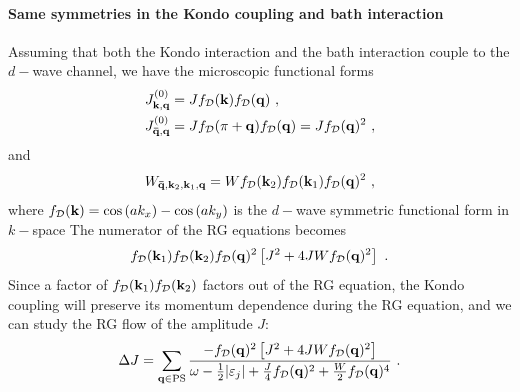 \documentclass[reprint,hidelinks]{revtex4-2}
\begin{document}
\paragraph{Same symmetries in the Kondo coupling and bath interaction}
Assuming that both the Kondo interaction and the bath interaction couple to the \(d-\)wave channel, we have the microscopic functional forms 
\begin{equation}\begin{aligned}
	J^{(0)}_{{\bf k},{\bf q}} &= J f_\mathcal{D}({\bf k}) f_\mathcal{D}({\bf q})~,\\
	J^{(0)}_{{\bf \bar q},{\bf q}} &= J f_\mathcal{D}(\pi + {\bf q}) f_\mathcal{D}({\bf q}) = Jf_\mathcal{D}({\bf q})^2 ~,
\end{aligned}\end{equation}
and
\begin{equation}\begin{aligned}
	W_{{\bf \bar q}, {\bf k}_2, {\bf k}_1, {\bf q}} = W f_\mathcal{D}({\bf k}_2)f_\mathcal{D}({\bf k}_1)f_\mathcal{D}({\bf q})^2~,
\end{aligned}\end{equation}
where \(f_\mathcal{D}({\bf k}) = \cos\left( ak_{x} \right) - \cos\left( ak_y \right) \) is the \(d-\)wave symmetric functional form in \(k-\)space
The numerator of the RG equations becomes
\begin{equation}\begin{aligned}
	f_\mathcal{D}({\bf k}_1)f_\mathcal{D}({\bf k}_2)f_\mathcal{D}({\bf q})^2\left[J^2 + 4JWf_\mathcal{D}({\bf q})^2\right] ~.
\end{aligned}\end{equation}
Since a factor of \(f_\mathcal{D}({\bf k}_1)f_\mathcal{D}({\bf k}_2)\) factors out of the RG equation, the Kondo coupling will preserve its momentum dependence during the RG equation, and we can study the RG flow of the amplitude \(J\):
\begin{equation}\begin{aligned}
	\Delta J = \sum_{{\bf q} \in \text{PS}} \frac{-f_\mathcal{D}({\bf q})^2\left[J^2 + 4JWf_\mathcal{D}({\bf q})^2\right]}{\omega - \frac{1}{2}|\varepsilon_j| + \frac{J}{4}f_\mathcal{D}({\bf q})^2 + \frac{W}{2}f_\mathcal{D}({\bf q})^4}~.
\end{aligned}\end{equation}
\end{document}
